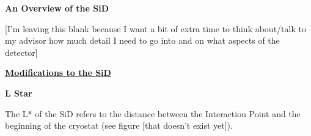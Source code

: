 \documentclass{article}
\begin{document}
        \vspace{5mm}
        \begin{center} \bf{An Overview of the SiD} \end{center}

        [I'm leaving this blank because I want a bit of extra time to think about/talk to my advisor how much detail I need to go into and on what aspects of the detector]



    \vspace{10mm}
    \begin{center}
        \underline{\bf{\large Modifications to the SiD}}
    \end{center}
        \begin{center}
            \bf{L Star}
        \end{center}

        The L* of the SiD refers to the distance between the Interaction Point and the beginning of the cryostat (see figure [that doesn't exist yet]).
\end{document}

